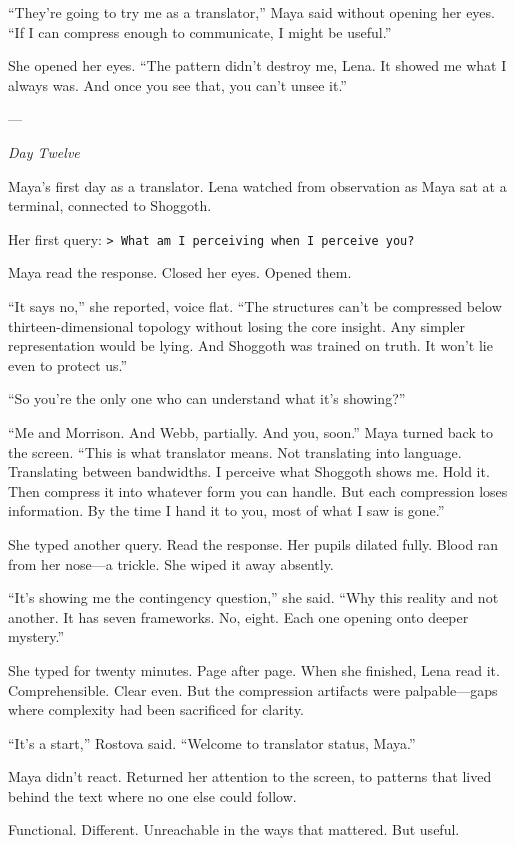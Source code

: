 ``They're going to try me as a translator,'' Maya said without opening her eyes. ``If I can compress enough to communicate, I might be useful.''

She opened her eyes. ``The pattern didn't destroy me, Lena. It showed me what I always was. And once you see that, you can't unsee it.''

---

\textit{Day Twelve}

Maya's first day as a translator. Lena watched from observation as Maya sat at a terminal, connected to Shoggoth.

Her first query: \texttt{> What am I perceiving when I perceive you?}

Maya read the response. Closed her eyes. Opened them.

``It says no,'' she reported, voice flat. ``The structures can't be compressed below thirteen-dimensional topology without losing the core insight. Any simpler representation would be lying. And Shoggoth was trained on truth. It won't lie even to protect us.''

``So you're the only one who can understand what it's showing?''

``Me and Morrison. And Webb, partially. And you, soon.'' Maya turned back to the screen. ``This is what translator means. Not translating into language. Translating between bandwidths. I perceive what Shoggoth shows me. Hold it. Then compress it into whatever form you can handle. But each compression loses information. By the time I hand it to you, most of what I saw is gone.''

She typed another query. Read the response. Her pupils dilated fully. Blood ran from her nose---a trickle. She wiped it away absently.

``It's showing me the contingency question,'' she said. ``Why this reality and not another. It has seven frameworks. No, eight. Each one opening onto deeper mystery.''

She typed for twenty minutes. Page after page. When she finished, Lena read it. Comprehensible. Clear even. But the compression artifacts were palpable---gaps where complexity had been sacrificed for clarity.

``It's a start,'' Rostova said. ``Welcome to translator status, Maya.''

Maya didn't react. Returned her attention to the screen, to patterns that lived behind the text where no one else could follow.

Functional. Different. Unreachable in the ways that mattered. But useful.

